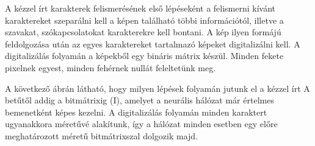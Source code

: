 A kézzel írt karakterek felismerésének első lépéseként a felismerni kívánt karaktereket szeparálni kell a képen található többi információtól, illetve a szavakat, szókapcsolatokat karakterekre kell bontani. A kép ilyen formájú feldolgozása után az egyes karaktereket tartalmazó képeket digitalizálni kell. A digitalizálás folyamán a képekből egy bináris mátrix készül. Minden fekete pixelnek egyest, minden fehérnek nullát feleltetünk meg. 

A következő ábrán látható, hogy milyen lépések folyamán jutunk el a kézzel írt A betűtől addig a bitmátrixig (I), amelyet a neurális hálózat már értelmes bemenetként képes kezelni. A digitalizálás folyamán minden karaktert ugyanakkora méretűvé alakítunk, így a hálózat minden esetben egy előre meghatározott méretű bitmátrixszal dolgozik majd. 